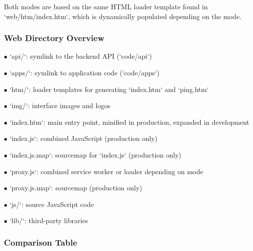 \documentclass[a4paper]{article}
\begin{document}
Both modes are based on the same HTML loader template found in `web/htm/index.htm`, which is dynamically populated depending on the mode.

\hypertarget{toc46}{}
\subsubsection{Web Directory Overview}

\begin{compactitem}
\item[\color{myblue}$\bullet$] `api/`: symlink to the backend API (`code/api`)
\item[\color{myblue}$\bullet$] `apps/`: symlink to application code (`code/apps`)
\item[\color{myblue}$\bullet$] `htm/`: loader templates for generating `index.htm` and `ping.htm`
\item[\color{myblue}$\bullet$] `img/`: interface images and logos
\item[\color{myblue}$\bullet$] `index.htm`: main entry point, minified in production, expanded in development
\item[\color{myblue}$\bullet$] `index.js`: combined JavaScript (production only)
\item[\color{myblue}$\bullet$] `index.js.map`: sourcemap for `index.js` (production only)
\item[\color{myblue}$\bullet$] `proxy.js`: combined service worker or loader depending on mode
\item[\color{myblue}$\bullet$] `proxy.js.map`: sourcemap (production only)
\item[\color{myblue}$\bullet$] `js/`: source JavaScript code
\item[\color{myblue}$\bullet$] `lib/`: third-party libraries
\end{compactitem}

\hypertarget{toc47}{}
\subsubsection{Comparison Table}
\end{document}
